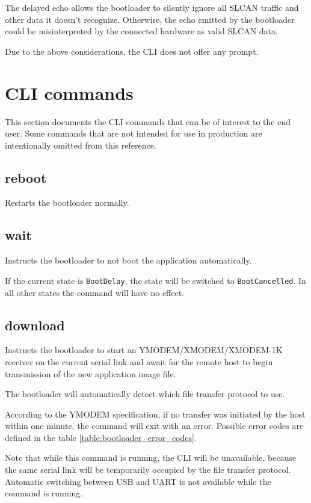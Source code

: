 \documentclass{zubaxdoc}
\begin{document}
The delayed echo allows the bootloader to silently ignore all SLCAN traffic and other data it doesn't recognize.
Otherwise, the echo emitted by the bootloader could be misinterpreted by the connected hardware
as valid SLCAN data.

Due to the above considerations, the CLI does not offer any prompt.

\section{CLI commands}

This section documents the CLI commands that can be of interest to the end user.
Some commands that are not intended for use in production are intentionally omitted from this reference.

\subsection{reboot}

Restarts the bootloader normally.

\subsection{wait}

Instructs the bootloader to not boot the application automatically.

If the current state is \verb|BootDelay|, the state will be switched to \verb|BootCancelled|.
In all other states the command will have no effect.

\subsection{download}

Instructs the bootloader to start an YMODEM/XMODEM/XMODEM-1K receiver on the current serial link
and await for the remote host to begin transmission of the new application image file.

The bootloader will automatically detect which file transfer protocol to use.

According to the YMODEM specification, if no transfer was initiated by the host within one minute,
the command will exit with an error.
Possible error codes are defined in the table \ref{table:bootloader_error_codes}.

Note that while this command is running, the CLI will be unavailable,
because the same serial link will be temporarily occupied by the file transfer protocol.
Automatic switching between USB and UART is not available while the command is running.
\end{document}
